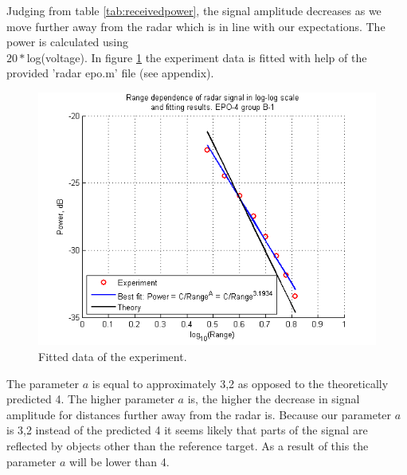 \documentclass[final]{scrreprt} %
\begin{document}
Judging from table \ref{tab:receivedpower}, the signal amplitude decreases as we move further away from the radar which is in line with our expectations.
The power is calculated using \\ $20 * $log(voltage).
In figure \ref{fig: Fitteddata} the experiment data is fitted with help of the provided 'radar \textunderscore epo.m' file (see appendix).

\begin{figure}[H]
\begin{center}
\includegraphics[scale = 1]{data/Fitteddata.png}
\caption{Fitted data of the experiment.}
\label{fig: Fitteddata}
\end{center}
\end{figure}

The parameter $a$ is equal to approximately 3,2 as opposed to the theoretically \\predicted 4. The higher parameter $a$ is, the higher the decrease in signal amplitude for distances further away from the radar is. 
Because our parameter $a$ is 3,2 instead of the predicted 4 it seems likely that parts of the signal are reflected by objects other than the reference target. 
As a result of this the parameter $a$ will be lower than 4.
\end{document}
